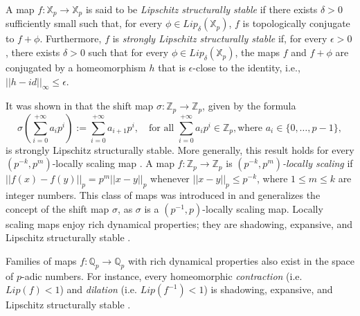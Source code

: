 \documentclass[a4paper, 12pt]{article}
\theoremstyle{definition}
\begin{document}
	
	
	A map $f: \mathbb{X}_{p} \to \mathbb{X}_{p} $ is said to be \textit{Lipschitz structurally stable} if there exists $\delta > 0$ sufficiently small such that, for every $\phi \in Lip_{\delta} \left(  \mathbb{X}_{p}  \right) $, $f$ is topologically conjugate to $f + \phi$. 
	Furthermore, $f$ is \textit{strongly Lipschitz structurally stable} if, for every $ \epsilon > 0$, there exists $ \delta  > 0$ such that for every $\phi \in Lip_{\delta} \left(  \mathbb{X}_{p}  \right) $, the maps $f$ and $f+ \phi$ are conjugated by a homeomorphism $h$ that is $ \epsilon $-close to the identity, i.e., $ \left| \left|  h - id  \right|  \right|_{ \infty } \le  \epsilon $.
	
	
	
	It was shown in \cite{Kingsbery_Levin_Preygel_Silva-Dynamics_of_the_p-adic_shift_and_applications} that the shift map $\sigma: \mathbb{Z}_{p} \to \mathbb{Z}_{p} $, given by the formula 
	\begin{equation}\label{Eq1_Shift Map Zp}  
		\sigma  \left(  \sum_{i=0}^{+\infty} a_i p^{i}  \right)    :=   \sum_{i=0}^{+\infty} a_{i+1} p^{i}, \quad \text{for all }   \sum_{i=0}^{+\infty} a_i p^{i} \in \mathbb{Z}_{p},   \text{where }  a_i \in \{0, \ldots, p-1\} ,
	\end{equation}
	is strongly Lipschitz structurally stable. 
	More generally, this result holds for every $(p^{-k}, p^m)$-locally scaling map \cite{Bastos-Caprio-Messaudi_Shadowing_and_Stability_in_p-adic_Dynamics}. A map $f: \mathbb{Z}_{p} \to \mathbb{Z}_{p}$ is \textit{$  \left(  p^{-k}, p^{m}  \right) $-locally scaling} if 
	$ \left| \left|  f(x) - f(y)  \right|  \right|_{p}  =  p^{m}   \left| \left|  x - y  \right|  \right|_{p} $ whenever $ \left| \left|  x- y  \right|  \right|_{p} \le p^{-k}$, where $1 \leq m \leq k$  are integer numbers. 
	This class of maps was introduced in \cite{Kingsbery_Levin_Preygel_Silva-Dynamics_of_the_p-adic_shift_and_applications} and generalizes the concept of the shift map $ \sigma $, as $ \sigma $ is a $ \left(  p^{-1}, p  \right) $-locally scaling map. Locally scaling maps enjoy rich dynamical properties; they are shadowing, expansive, and Lipschitz structurally stable \cite{Bastos-Caprio-Messaudi_Shadowing_and_Stability_in_p-adic_Dynamics}.
	
	Families of maps $f: \mathbb{Q}_p \to \mathbb{Q}_p$  with rich dynamical properties also exist in the space of $p$-adic numbers. For instance, every homeomorphic \textit{contraction} (i.e. $Lip \left(  f  \right)   < 1$) and \textit{dilation} (i.e. $Lip \left(  f^{-1} \right)  < 1$) is shadowing, expansive, and Lipschitz structurally stable \cite{Bastos-Caprio-Messaudi_Shadowing_and_Stability_in_p-adic_Dynamics}. 
	
\end{document}
